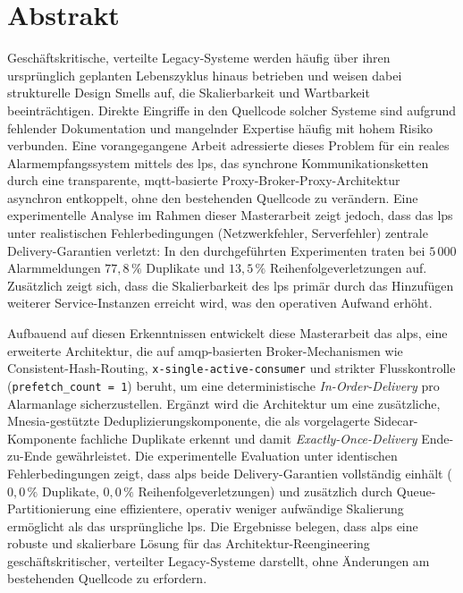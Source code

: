 
\chapter*{Abstrakt}

Geschäftskritische, verteilte Legacy-Systeme werden häufig über ihren ur\-sprüng\-lich geplanten Lebenszyklus hinaus betrieben und weisen dabei strukturelle Design Smells auf, die Skalierbarkeit und Wartbarkeit beeinträchtigen. Direkte Eingriffe in den Quellcode solcher Systeme sind aufgrund fehlender Dokumentation und mangelnder Expertise häufig mit hohem Risiko verbunden. Eine vorangegangene Arbeit adressierte dieses Problem für ein reales Alarmempfangssystem mittels des \gls{lps}, das synchrone Kommunikationsketten durch eine transparente, \gls{mqtt}-basierte Proxy-Broker-Proxy-Architektur asynchron entkoppelt, ohne den bestehenden Quellcode zu verändern. Eine experimentelle Analyse im Rahmen dieser Masterarbeit zeigt jedoch, dass das \gls{lps} unter realistischen Fehlerbedingungen (Netzwerkfehler, Serverfehler) zentrale Delivery-Garantien verletzt: In den durchgeführten Experimenten traten bei $5\,000$ Alarmmeldungen $77{,}8\,\%$ Duplikate und $13{,}5\,\%$ Reihenfolgeverletzungen auf. Zusätzlich zeigt sich, dass die Skalierbarkeit des \gls{lps} primär durch das Hinzufügen weiterer Service-Instanzen erreicht wird, was den operativen Aufwand erhöht.

Aufbauend auf diesen Erkenntnissen entwickelt diese Masterarbeit das \gls{alps}, eine erweiterte Architektur, die auf \gls{amqp}-basierten Broker-Mechanismen wie Consistent-Hash-Routing, \texttt{x-single-active-consumer} und strikter Flusskontrolle (\texttt{prefetch\_count = 1}) beruht, um eine deterministische \textit{In-Order-Delivery} pro Alarmanlage sicherzustellen. Ergänzt wird die Architektur um eine zu\-sätz\-li\-che, Mnesia-gestützte Deduplizierungskomponente, die als vorgelagerte Sidecar-Komponente fachliche Duplikate erkennt und damit \textit{Exactly-Once-Delivery} Ende-zu-Ende gewährleistet. Die experimentelle Evaluation unter identischen Fehlerbedingungen zeigt, dass \gls{alps} beide Delivery-Garantien vollständig einhält ($0{,}0\,\%$ Duplikate, $0{,}0\,\%$ Reihenfolgeverletzungen) und zu\-sätz\-lich durch Queue-Partitionierung eine effizientere, operativ weniger aufwändige Skalierung ermöglicht als das ursprüngliche \gls{lps}. Die Ergebnisse belegen, dass \gls{alps} eine robuste und skalierbare Lösung für das Architektur-Reengineering geschäftskritischer, verteilter Legacy-Systeme darstellt, ohne Änderungen am bestehenden Quellcode zu erfordern.

